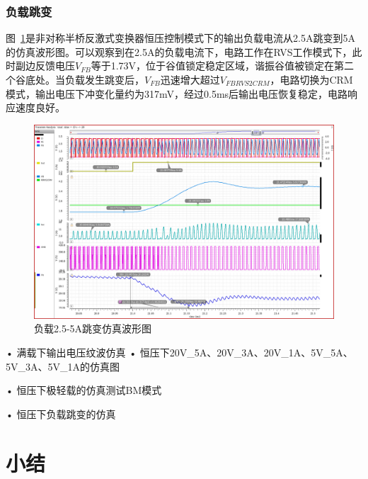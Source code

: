 
\subsubsection{负载跳变}

图~\ref{fig:负载2.5_5A跳变仿真波形图}是非对称半桥反激式变换器恒压控制模式下的输出负载电流从2.5A跳变到5A的仿真波形图。可以观察到在2.5A的负载电流下，电路工作在RVS工作模式下，此时副边反馈电压$V_{FB}$等于1.73V，位于谷值锁定稳定区域，谐振谷值被锁定在第二个谷底处。当负载发生跳变后，$V_{FB}$迅速增大超过$V_{FBRVS2CRM}$，电路切换为CRM模式，输出电压下冲变化量约为317mV，经过0.5ms后输出电压恢复稳定，电路响应速度良好。


\begin{figure}[htbp] 
    \centering
    \includegraphics[width=0.8\linewidth]{figures/2.5A_ 5A.png}
    \caption{负载2.5-5A跳变仿真波形图}
    \label{fig:负载2.5_5A跳变仿真波形图}
\end{figure} 



• 满载下输出电压纹波仿真
• 恒压下20V\_5A、20V\_3A、20V\_1A、5V\_5A、5V\_3A、5V\_1A的仿真图

• 恒压下极轻载的仿真测试BM模式

• 恒压下负载跳变的仿真



\section{小结}




